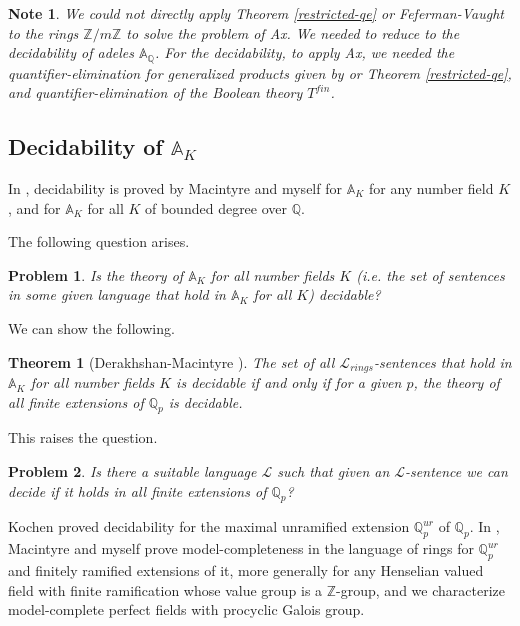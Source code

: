 \documentclass[12pt]{amsart}
\def\A{\mathbb{A}}
\def\Z{\mathbb{Z}}
\def\cL{\mathcal{L}}
\def\Q{\mathbb{Q}}
\def\cL{\mathcal{L}}
\newtheorem{thm}{Theorem}[section]
\numberwithin{equation}{section}
\newtheorem{prob}{Problem}[section]
\newtheorem{note}{Note}[section]
\begin{document}
\begin{note} We could not directly apply Theorem \ref{restricted-qe} or Feferman-Vaught \cite{FV} to the rings $\Z/m\Z$ to solve the problem of Ax. We needed to reduce to the decidability of adeles $\A_{\Q}$. For the decidability, to apply Ax, we needed the quantifier-elimination for generalized products given by \cite{FV} or Theorem \ref{restricted-qe}, and quantifier-elimination of the Boolean theory $T^{fin}$.\end{note}

\medskip

\subsection{\bf Decidability of $\A_K$}\label{ssec-decK}

In \cite{DM-ad2}, decidability is proved by Macintyre and myself for $\A_K$ for any number field $K$, and for 
$\A_K$ for all $K$ of bounded degree over $\Q$. 

The following question arises.

\begin{prob}\cite{DM-ad} Is the theory of $\A_K$ for all number fields $K$ (i.e. the set of sentences in some given language that hold in $\A_K$ for all $K$) decidable?\end{prob}

We can show the following.

\begin{thm}[Derakhshan-Macintyre {\cite{DM-ad}\cite{DM-ad2}}] The set of all $\cL_{rings}$-sentences that hold in $\A_K$ for all number fields $K$  is decidable if and only if for a given $p$, the theory of all finite extensions of $\Q_p$ is decidable.\end{thm}

This raises the question.

\begin{prob}\cite{DM-ad} \label{prob-allfin} Is there a suitable language $\cL$ such that given an $\cL$-sentence 
we can decide if it holds in all finite extensions of $\Q_p$?\end{prob}

Kochen \cite{kochen-local} proved decidability for the maximal unramified extension $\Q_p^{ur}$ of $\Q_p$. In \cite{DM-MC}, Macintyre and myself prove model-completeness in the language of rings for $\Q_p^{ur}$ and finitely ramified extensions of it, more generally for any Henselian valued field with finite ramification whose value group is a $\Z$-group, and we characterize model-complete perfect fields with procyclic Galois group. 
\end{document}
